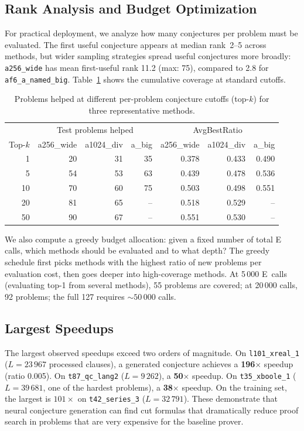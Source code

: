 \documentclass{easychair}
\newcommand{\Eprover}{E\xspace}
\begin{document}
\subsection{Rank Analysis and Budget Optimization}

For practical deployment, we analyze how many conjectures per problem
must be evaluated.  The first useful conjecture appears at median
rank~2--5 across methods, but wider sampling strategies spread useful
conjectures more broadly: \texttt{a256\_wide} has mean first-useful
rank 11.2 (max: 75), compared to 2.8 for \texttt{af6\_a\_named\_big}.
Table~\ref{tab:rank} shows the cumulative coverage at standard
cutoffs.

\begin{table}[t]
\centering
\caption{Problems helped at different per-problem conjecture cutoffs
  (top-$k$) for three representative methods.}
\label{tab:rank}
\small
\begin{tabular}{r|rrr|rrr}
\toprule
 & \multicolumn{3}{c|}{Test problems helped}
 & \multicolumn{3}{c}{AvgBestRatio} \\
Top-$k$ & a256\_wide & a1024\_div & a\_big & a256\_wide & a1024\_div & a\_big \\
\midrule
1  &  20 &  31 &  35 & 0.378 & 0.433 & 0.490 \\
5  &  54 &  53 &  63 & 0.439 & 0.478 & 0.536 \\
10 &  70 &  60 &  75 & 0.503 & 0.498 & 0.551 \\
20 &  81 &  65 &  -- & 0.518 & 0.529 & -- \\
50 &  90 &  67 &  -- & 0.551 & 0.530 & -- \\
\bottomrule
\end{tabular}
\end{table}

We also compute a greedy budget allocation: given a fixed number of
total \Eprover calls, which methods should be evaluated and to what
depth?  The greedy schedule first picks methods with the highest
ratio of new problems per evaluation cost, then goes deeper into
high-coverage methods.  At 5\,000 E~calls (evaluating top-1 from
several methods), 55 problems are covered; at 20\,000 calls, 92
problems; the full 127 requires ${\sim}50\,000$ calls.

\subsection{Largest Speedups}

The largest observed speedups exceed two orders of magnitude.  On
\texttt{l101\_xreal\_1} ($L = 23\,967$ processed clauses), a
generated conjecture achieves a \textbf{196$\times$} speedup (ratio
0.005).  On \texttt{t87\_qc\_lang2} ($L = 9\,262$), a
\textbf{50$\times$} speedup.  On \texttt{t35\_xboole\_1}
($L = 39\,681$, one of the hardest problems), a \textbf{38$\times$}
speedup.  On the training set, the largest is $101\times$ on
\texttt{t42\_series\_3} ($L = 32\,791$).  These demonstrate that
neural conjecture generation can find cut formulas that dramatically
reduce proof search in problems that are very expensive for the
baseline prover.
\end{document}
